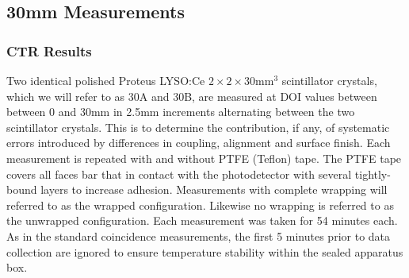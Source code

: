 \subsection{30mm Measurements}
\subsubsection{CTR Results}
Two identical polished Proteus LYSO:Ce $2\times2\times30$mm$^3$ scintillator crystals, which we will refer to as 30A and 30B, are measured at DOI values between between 0 and 30mm in 2.5mm increments alternating between the two scintillator crystals. This is to determine the contribution, if any, of systematic errors introduced by differences in coupling, alignment and surface finish. Each measurement is repeated with and without PTFE (Teflon) tape. The PTFE tape covers all faces bar that in contact with the photodetector with several tightly-bound layers to increase adhesion. Measurements with complete wrapping will referred to as the wrapped configuration. Likewise no wrapping is referred to as the unwrapped configuration. Each measurement was taken for 54 minutes each. As in the standard coincidence measurements, the first 5 minutes prior to data collection are ignored to ensure temperature stability within the sealed apparatus box.

